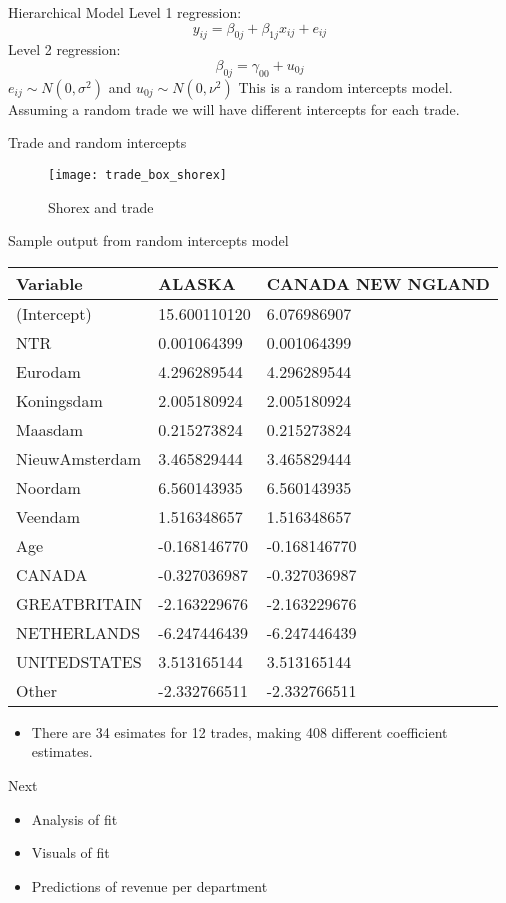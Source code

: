 \documentclass{beamer}
\begin{document}
\begin{frame}{Hierarchical Model}
	Level 1 regression: \\
	\[ y_{ij} = \beta_{0j} + \beta_{1j}x_{ij} + e_{ij} \]
	Level 2 regression:
	\[ \beta_{0j} = \gamma_{00} + u_{0j} \]
	$ e_{ij} \sim N(0, \sigma^2) $ and $ u_{0j} \sim N(0, \nu^2)$
	This is a random intercepts model. \\
	Assuming a random trade we will have different intercepts for each trade. 
\end{frame}

\begin{frame}{Trade and random intercepts}
	\begin{figure}
		\centering
		\texttt{[image: trade\_box\_shorex]}
		\caption{Shorex and trade}
	\end{figure}
\end{frame}

\begin{frame}{Sample output from random intercepts model}
	\centering
\begin{tabular}{lll}
	 Variable & ALASKA & CANADA  NEW NGLAND \\
	\hline 
	(Intercept) & 15.600110120 & 6.076986907 \\
	NTR & 0.001064399 & 0.001064399 \\
	Eurodam & 4.296289544 & 4.296289544 \\
	Koningsdam & 2.005180924 & 2.005180924 \\
	Maasdam & 0.215273824 & 0.215273824 \\
	NieuwAmsterdam & 3.465829444 & 3.465829444 \\
	Noordam & 6.560143935 & 6.560143935 \\
	Veendam & 1.516348657 & 1.516348657 \\
	Age & -0.168146770 & -0.168146770 \\
	CANADA & -0.327036987 & -0.327036987 \\
	GREATBRITAIN & -2.163229676 & -2.163229676 \\
	NETHERLANDS & -6.247446439 & -6.247446439 \\
	UNITEDSTATES & 3.513165144 & 3.513165144 \\
	Other & -2.332766511 & -2.332766511 \\
	\hline 
\end{tabular}
	\begin{itemize}
		\item There are 34 esimates for 12 trades, making 408 different coefficient estimates.
	\end{itemize}
\end{frame}

\begin{frame}{Next}
	\begin{itemize}
		\item Analysis of fit
		\item Visuals of fit
		\item Predictions of revenue per department
	\end{itemize}
\end{frame}
\end{document}
